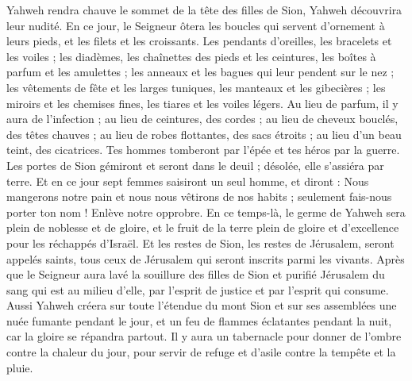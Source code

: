 \begin{multicols}{2}
Yahweh rendra chauve le sommet de la tête des filles de Sion, Yahweh découvrira leur nudité.
En ce jour, le Seigneur ôtera les boucles qui servent d'ornement à leurs pieds, et les filets et les croissants.
Les pendants d'oreilles, les bracelets et les voiles ;
les diadèmes, les chaînettes des pieds et les ceintures, les boîtes à parfum et les amulettes ;
les anneaux et les bagues qui leur pendent sur le nez ;
les vêtements de fête et les larges tuniques, les manteaux et les gibecières ;
les miroirs et les chemises fines, les tiares et les voiles légers.
Au lieu de parfum, il y aura de l'infection ; au lieu de ceintures, des cordes ; au lieu de cheveux bouclés, des têtes chauves ; au lieu de robes flottantes, des sacs étroits ; au lieu d'un beau teint, des cicatrices.
Tes hommes tomberont par l'épée et tes héros par la guerre.
Les portes de Sion gémiront et seront dans le deuil ; désolée, elle s'assiéra par terre.
\VerseOne{}Et en ce jour sept femmes saisiront un seul homme, et diront : Nous mangerons notre pain et nous nous vêtirons de nos habits ; seulement fais-nous porter ton nom ! Enlève notre opprobre.
En ce temps-là, le germe de Yahweh sera plein de noblesse et de gloire, et le fruit de la terre plein de gloire et d'excellence pour les réchappés d'Israël.
Et les restes de Sion, les restes de Jérusalem, seront appelés saints, tous ceux de Jérusalem qui seront inscrits parmi les vivants.
Après que le Seigneur aura lavé la souillure des filles de Sion et purifié Jérusalem du sang qui est au milieu d'elle, par l'esprit de justice et par l'esprit qui consume.
Aussi Yahweh créera sur toute l'étendue du mont Sion et sur ses assemblées une nuée fumante pendant le jour, et un feu de flammes éclatantes pendant la nuit, car la gloire se répandra partout.
Il y aura un tabernacle pour donner de l'ombre contre la chaleur du jour, pour servir de refuge et d'asile contre la tempête et la pluie.

\end{multicols}
